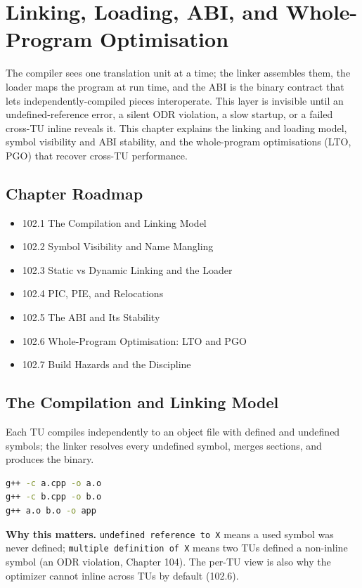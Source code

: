 \chapter{Linking, Loading, ABI, and Whole-Program Optimisation}

The compiler sees one translation unit at a time; the linker assembles them, the loader maps the program at run time, and the ABI is the binary contract that lets independently-compiled pieces interoperate. This layer is invisible until an undefined-reference error, a silent ODR violation, a slow startup, or a failed cross-TU inline reveals it. This chapter explains the linking and loading model, symbol visibility and ABI stability, and the whole-program optimisations (LTO, PGO) that recover cross-TU performance.

\section*{Chapter Roadmap}
\begin{itemize}
\item 102.1 The Compilation and Linking Model
\item 102.2 Symbol Visibility and Name Mangling
\item 102.3 Static vs Dynamic Linking and the Loader
\item 102.4 PIC, PIE, and Relocations
\item 102.5 The ABI and Its Stability
\item 102.6 Whole-Program Optimisation: LTO and PGO
\item 102.7 Build Hazards and the Discipline
\end{itemize}

\section{The Compilation and Linking Model}
Each TU compiles independently to an object file with defined and undefined symbols; the linker resolves every undefined symbol, merges sections, and produces the binary.

\begin{lstlisting}[language=bash, caption={Separate compilation then linking.}]
g++ -c a.cpp -o a.o
g++ -c b.cpp -o b.o
g++ a.o b.o -o app
\end{lstlisting}

\textbf{Why this matters.} \texttt{undefined reference to X} means a used symbol was never defined; \texttt{multiple definition of X} means two TUs defined a non-inline symbol (an ODR violation, Chapter 104). The per-TU view is also why the optimizer cannot inline across TUs by default (102.6).

